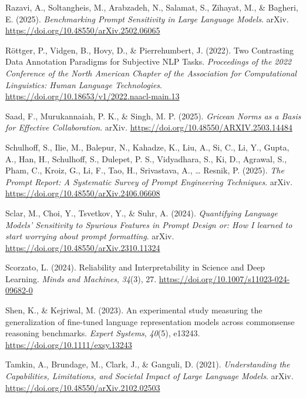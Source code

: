 \documentclass[
  12pt,
]{article}
\newlength{\cslhangindent}
\newenvironment{CSLReferences}[2] %
 {\begin{list}{}{%
  \setlength{\itemindent}{0pt}
  \setlength{\leftmargin}{0pt}
  \setlength{\parsep}{0pt}
  \ifodd #1
   \setlength{\leftmargin}{\cslhangindent}
   \setlength{\itemindent}{-1\cslhangindent}
  \fi
  \setlength{\itemsep}{#2\baselineskip}}}
 {\end{list}}
\begin{document}
\begin{CSLReferences}{1}{0}
Razavi, A., Soltangheis, M., Arabzadeh, N., Salamat, S., Zihayat, M., \& Bagheri, E. (2025). \emph{Benchmarking {Prompt} {Sensitivity} in {Large} {Language} {Models}}. arXiv. \url{https://doi.org/10.48550/arXiv.2502.06065}

Röttger, P., Vidgen, B., Hovy, D., \& Pierrehumbert, J. (2022). Two {Contrasting} {Data} {Annotation} {Paradigms} for {Subjective} {NLP} {Tasks}. \emph{Proceedings of the 2022 {Conference} of the {North} {American} {Chapter} of the {Association} for {Computational} {Linguistics}: {Human} {Language} {Technologies}}. \url{https://doi.org/10.18653/v1/2022.naacl-main.13}

Saad, F., Murukannaiah, P. K., \& Singh, M. P. (2025). \emph{Gricean {Norms} as a {Basis} for {Effective} {Collaboration}}. arXiv. \url{https://doi.org/10.48550/ARXIV.2503.14484}

Schulhoff, S., Ilie, M., Balepur, N., Kahadze, K., Liu, A., Si, C., Li, Y., Gupta, A., Han, H., Schulhoff, S., Dulepet, P. S., Vidyadhara, S., Ki, D., Agrawal, S., Pham, C., Kroiz, G., Li, F., Tao, H., Srivastava, A., \ldots{} Resnik, P. (2025). \emph{The {Prompt} {Report}: {A} {Systematic} {Survey} of {Prompt} {Engineering} {Techniques}}. arXiv. \url{https://doi.org/10.48550/arXiv.2406.06608}

Sclar, M., Choi, Y., Tsvetkov, Y., \& Suhr, A. (2024). \emph{Quantifying {Language} {Models}' {Sensitivity} to {Spurious} {Features} in {Prompt} {Design} or: {How} {I} learned to start worrying about prompt formatting}. arXiv. \url{https://doi.org/10.48550/arXiv.2310.11324}

Scorzato, L. (2024). Reliability and {Interpretability} in {Science} and {Deep} {Learning}. \emph{Minds and Machines}, \emph{34}(3), 27. \url{https://doi.org/10.1007/s11023-024-09682-0}

Shen, K., \& Kejriwal, M. (2023). An experimental study measuring the generalization of fine-tuned language representation models across commonsense reasoning benchmarks. \emph{Expert Systems}, \emph{40}(5), e13243. \url{https://doi.org/10.1111/exsy.13243}

Tamkin, A., Brundage, M., Clark, J., \& Ganguli, D. (2021). \emph{Understanding the {Capabilities}, {Limitations}, and {Societal} {Impact} of {Large} {Language} {Models}}. arXiv. \url{https://doi.org/10.48550/arXiv.2102.02503}


\end{CSLReferences}
\end{document}
